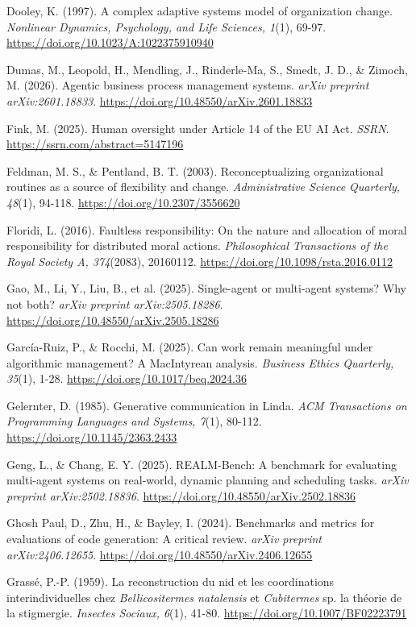 \documentclass[12pt,a4paper]{article}
\begin{document}
Dooley, K. (1997). A complex adaptive systems model of organization
change. \emph{Nonlinear Dynamics, Psychology, and Life Sciences, 1}(1),
69-97. \url{https://doi.org/10.1023/A:1022375910940}

Dumas, M., Leopold, H., Mendling, J., Rinderle-Ma, S., Smedt, J. D., \&
Zimoch, M. (2026). Agentic business process management systems.
\emph{arXiv preprint arXiv:2601.18833}.
\url{https://doi.org/10.48550/arXiv.2601.18833}

Fink, M. (2025). Human oversight under Article 14 of the EU AI Act.
\emph{SSRN}. \url{https://ssrn.com/abstract=5147196}

Feldman, M. S., \& Pentland, B. T. (2003). Reconceptualizing
organizational routines as a source of flexibility and change.
\emph{Administrative Science Quarterly, 48}(1), 94-118.
\url{https://doi.org/10.2307/3556620}

Floridi, L. (2016). Faultless responsibility: On the nature and
allocation of moral responsibility for distributed moral actions.
\emph{Philosophical Transactions of the Royal Society A, 374}(2083),
20160112. \url{https://doi.org/10.1098/rsta.2016.0112}

Gao, M., Li, Y., Liu, B., et al. (2025). Single-agent or multi-agent
systems? Why not both? \emph{arXiv preprint arXiv:2505.18286}.
\url{https://doi.org/10.48550/arXiv.2505.18286}

García-Ruiz, P., \& Rocchi, M. (2025). Can work remain meaningful under
algorithmic management? A MacIntyrean analysis. \emph{Business Ethics
Quarterly, 35}(1), 1-28. \url{https://doi.org/10.1017/beq.2024.36}

Gelernter, D. (1985). Generative communication in Linda. \emph{ACM
Transactions on Programming Languages and Systems, 7}(1), 80-112.
\url{https://doi.org/10.1145/2363.2433}

Geng, L., \& Chang, E. Y. (2025). REALM-Bench: A benchmark for
evaluating multi-agent systems on real-world, dynamic planning and
scheduling tasks. \emph{arXiv preprint arXiv:2502.18836}.
\url{https://doi.org/10.48550/arXiv.2502.18836}

Ghosh Paul, D., Zhu, H., \& Bayley, I. (2024). Benchmarks and metrics
for evaluations of code generation: A critical review. \emph{arXiv
preprint arXiv:2406.12655}.
\url{https://doi.org/10.48550/arXiv.2406.12655}

Grassé, P.-P. (1959). La reconstruction du nid et les coordinations
interindividuelles chez \emph{Bellicositermes natalensis} et
\emph{Cubitermes} sp. la théorie de la stigmergie. \emph{Insectes
Sociaux, 6}(1), 41-80. \url{https://doi.org/10.1007/BF02223791}
\end{document}

